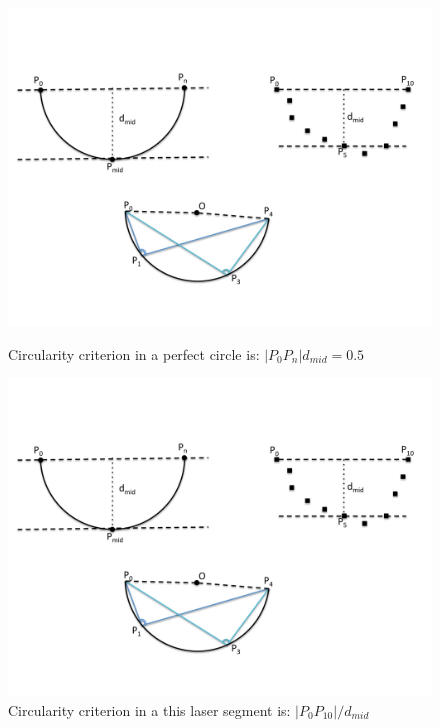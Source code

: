 \documentclass[12pt]{gatech-thesis}
\begin{document}
\begin{enumerate}
\begin{figure}[ht!]
  \centering
  \begin{minipage}[b]{0.49\textwidth}
    \includegraphics[width=\textwidth]{pics/circ1}   
    \caption{Circularity criterion in a perfect circle is: $|P_0P_n|d_{mid}=0.5$}
     \label{fig:circ1}
  \end{minipage}
  \hfill
  \begin{minipage}[b]{0.49\textwidth}
    \includegraphics[width=\textwidth]{pics/circ2}    
    \caption{Circularity criterion in a this laser segment is: $|P_0P_{10}|/d_{mid}$}
    \label{fig:circ2}
  \end{minipage}
\end{figure}


\end{enumerate}
\end{document}
